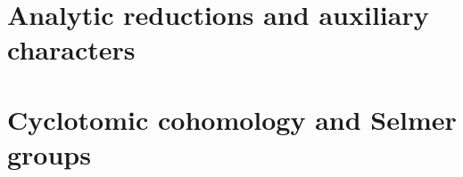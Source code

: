 \part{Analytic reductions and auxiliary characters}









\part{Cyclotomic cohomology and Selmer groups}














